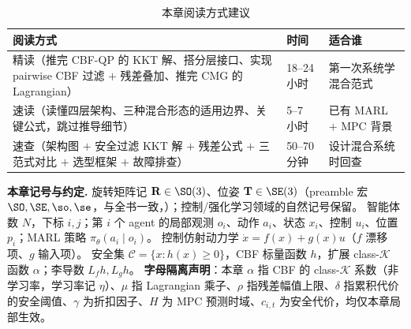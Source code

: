 \begin{table}[H]\centering\small
\caption{本章阅读方式建议}
\label{tab:mh-reading}
\begin{tabular}{lll}
\toprule
阅读方式 & 时间 & 适合谁 \\
\midrule
精读（推完 CBF-QP 的 KKT 解、搭分层接口、实现 pairwise CBF 过滤 $+$ 残差叠加、推完 CMG 的 Lagrangian） & 18--24 小时 & 第一次系统学混合范式 \\
速读（读懂四层架构、三种混合形态的适用边界、关键公式，跳过推导细节） & 5--7 小时 & 已有 MARL $+$ MPC 背景 \\
速查（架构图 $+$ 安全过滤 KKT 解 $+$ 残差公式 $+$ 三范式对比 $+$ 选型框架 $+$ 故障排查） & 50--70 分钟 & 设计混合系统时回查 \\
\bottomrule
\end{tabular}
\end{table}

\begin{note}
\textbf{本章记号与约定.}\;
旋转矩阵记 $\mathbf{R}\in\SO(3)$、位姿 $\mathbf{T}\in\SE(3)$（preamble 宏 $\SO,\SE,\so,\se$，与全书一致，）；控制/强化学习领域的自然记号保留。
智能体数 $N$，下标 $i,j$；第 $i$ 个 agent 的局部观测 $o_i$、动作 $a_i$、状态 $x_i$、控制 $u_i$、位置 $p_i$；MARL 策略 $\pi_\theta(a_i\mid o_i)$。
控制仿射动力学 $\dot x=f(x)+g(x)u$（$f$ 漂移项、$g$ 输入项）。
安全集 $\mathcal{C}=\{x:h(x)\ge0\}$，CBF 标量函数 $h$，扩展 class-$\mathcal{K}$ 函数 $\alpha$；李导数 $L_fh,L_gh$。
\textbf{字母隔离声明}：本章 $\alpha$ 指 CBF 的 class-$\mathcal{K}$ 系数（非学习率，学习率记 $\eta$）、$\mu$ 指 Lagrangian 乘子、$\rho$ 指残差幅值上限、$\delta$ 指累积代价的安全阈值、$\gamma$ 为折扣因子、$H$ 为 MPC 预测时域、$c_{i,t}$ 为安全代价，均仅本章局部生效。
\end{note}

